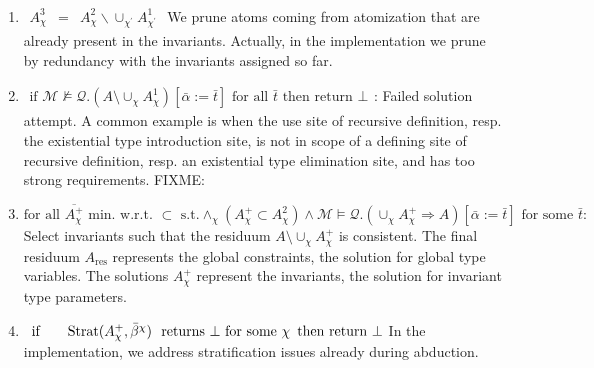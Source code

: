 \documentclass{article}
\newcommand{\assign}{:=}
\newcommand{\tmop}[1]{\ensuremath{\operatorname{#1}}}
\begin{document}
\begin{enumerate}
  \item $\begin{array}{lll}
    A^3_{\chi} & = & A^2_{\chi} \backslash \cup_{\chi^{\prime}}
    A^1_{\chi^{\prime}}
  \end{array}$ We prune atoms coming from atomization that are already present
  in the invariants. Actually, in the implementation we prune by redundancy
  with the invariants assigned so far.
  
  \item $\begin{array}{l}
    \text{if } \mathcal{M} \nvDash \mathcal{Q}. (A \setminus \cup_{\chi}
    A^1_{\chi}) [\bar{\alpha} \assign \bar{t}] \text{ \ for all } \bar{t}
    \text{ then return } \bot
  \end{array}$: Failed solution attempt. A common example is when the use site
  of recursive definition, resp. the existential type introduction site, is
  not in scope of a defining site of recursive definition, resp. an
  existential type elimination site, and has too strong requirements. FIXME:
  
  \item $\text{for all } \overline{A_{\chi}^+} \text{ min. w.r.t. } \subset
  \text{ s.t.} \wedge_{\chi} (A_{\chi}^+ \subset A_{\chi}^2) \wedge
  \mathcal{M} \vDash \mathcal{Q}. (\cup_{\chi} A_{\chi}^+ \Rightarrow A)
  [\bar{\alpha} \assign \bar{t}] \text{ \ for some } \bar{t} :$ Select
  invariants such that the residuum $A \setminus \cup_{\chi} A_{\chi}^+$ is
  consistent. The final residuum $A_{\tmop{res}}$ represents the global
  constraints, the solution for global type variables. The solutions
  $A_{\chi}^+$ represent the invariants, the solution for invariant type
  parameters.
  
  \item $\begin{array}{lll}
    \text{if} &  & \tmop{Strat} (A^+_{\chi}, \bar{\beta}^{\chi}) \text{ \
    returns } \bot \text{ for some } \chi
  \end{array} \text{then return } \bot$ In the implementation, we address
  stratification issues already during abduction.
  

\end{enumerate}
\end{document}
